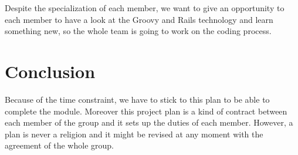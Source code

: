 \documentclass[a4paper,12pt]{article}
\begin{document}
Despite the specialization of each member, we want to give an opportunity to each member to have a look at the Groovy and Rails technology and learn something new,
so the whole team is going to work on the coding process.

\section{Conclusion}
Because of the time constraint, we have to stick to this plan to be able to complete the module. Moreover this project plan is a kind of contract between each member of the group and it sets up the duties of each member.
However, a plan is never a religion and it might be revised at any moment with the agreement of the whole group.
\end{document}
